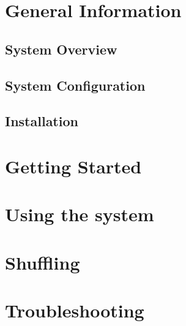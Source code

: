 \documentclass[hidelinks, 12pt, oneside]{article}
\begin{document}
\tableofcontents
\newpage
\section{General Information}
\subsection{System Overview}
	

\subsection{System Configuration}
	
\pagebreak
\subsection{Installation}
	
	
\newpage
\section{Getting Started}
	
	
\newpage
\section{Using the system}
	
	
\newpage
\section{Shuffling}	
	
\newpage
\section{Troubleshooting}
	
	
\end{document}
